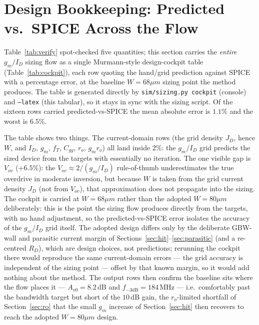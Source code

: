 \documentclass{article}
\begin{document}
\section{Design Bookkeeping: Predicted vs.\ SPICE Across the Flow}
\label{sec:cockpit}
Table~\ref{tab:verify} spot-checked five quantities; this section carries the
\emph{entire} $g_m/I_D$ sizing flow as a single Murmann-style design-cockpit table
(Table~\ref{tab:cockpit}), each row quoting the hand/grid prediction against SPICE
with a percentage error, at the baseline $W=68\mu m$ sizing point the method produces.
The table is generated directly by
\texttt{sim/sizing.py cockpit} (console) and \texttt{--latex} (this tabular), so it
stays in sync with the sizing script. Of the sixteen rows carried predicted-vs-SPICE
the mean absolute error is $1.1\%$ and the worst is $6.5\%$.

\begin{table}[H]
    \centering
    \footnotesize
    \caption{Design-cockpit bookkeeping at the baseline sized operating point
             ($W=68\mu m$, $g_m/I_D=15$, \texttt{tt}, $1.2V$, $27^\circ$C).
             Generated by \texttt{sim/sizing.py cockpit --latex}.}
    \label{tab:cockpit}
    
\end{table}

\noindent The table shows two things. The current-domain rows (the grid density $J_D$,
hence $W$, and $I_D$, $g_m$, $f_T$, $C_{gg}$, $r_o$, $g_m r_o$) all land inside $2\%$:
the $g_m/I_D$ grid predicts the sized device from the targets with essentially no
iteration. The one visible gap is $V_{ov}$ ($+6.5\%$): the $V_{ov}\approx2/(g_m/I_D)$
rule-of-thumb underestimates the true overdrive in moderate inversion, but because $W$
is taken from the grid current density $J_D$ (not from $V_{ov}$), that approximation
does not propagate into the sizing. The cockpit is carried at $W=68\mu m$ rather than the
adopted $W=80\mu m$ deliberately: this is the point the sizing flow produces directly
from the targets, with no hand adjustment, so the predicted-vs-SPICE error isolates the
accuracy of the $g_m/I_D$ grid itself. The adopted design differs only by the deliberate
GBW-wall and parasitic current margin of Sections~\ref{sec:hit}--\ref{sec:parasitic}
(and a re-centred $R_D$), which are design choices, not predictions; rerunning the cockpit
there would reproduce the same current-domain errors --- the grid accuracy is independent
of the sizing point --- offset by that known margin, so it would add nothing about the
method. The output rows then confirm the baseline sits where
the flow places it --- $A_{v0}=8.2\,$dB and $f_{-3\mathrm{dB}}=184\,$MHz --- i.e.\ comfortably past the
bandwidth target but short of the $10\,$dB gain, the $r_o$-limited shortfall of
Section~\ref{sec:ro} that the small $g_m$ increase of Section~\ref{sec:hit} then
recovers to reach the adopted $W=80\mu m$ design.
\end{document}
